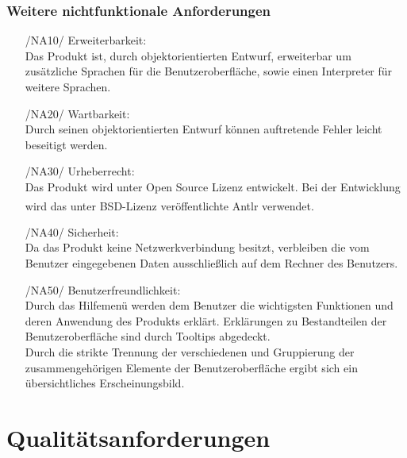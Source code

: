 \documentclass[parskip=full]{scrartcl}
\begin{document}
		\subsubsection{Weitere nichtfunktionale Anforderungen}
		\begin{itemize}
		\item[/NA10/]Erweiterbarkeit: \\
		Das Produkt ist, durch objektorientierten Entwurf, erweiterbar um zusätzliche Sprachen für die Benutzeroberfläche, sowie einen Interpreter für weitere Sprachen.
		\item[/NA20/]Wartbarkeit: \\
		Durch seinen objektorientierten Entwurf können auftretende Fehler leicht beseitigt werden.
		\item[/NA30/]Urheberrecht: \\
		Das Produkt wird unter Open Source Lizenz entwickelt. Bei der Entwicklung wird das unter BSD-Lizenz veröffentlichte Antlr\textsuperscript{\textcopyright} verwendet.
		\item[/NA40/] Sicherheit: \\
		Da das Produkt keine Netzwerkverbindung besitzt, verbleiben die vom Benutzer eingegebenen Daten ausschließlich auf dem Rechner des Benutzers.
		\item[/NA50/]Benutzerfreundlichkeit: \\
		Durch das Hilfemenü werden dem Benutzer die wichtigsten Funktionen und deren Anwendung des Produkts erklärt. Erklärungen zu Bestandteilen der Benutzeroberfläche sind durch \glspl{Tooltip} abgedeckt. \\
		Durch die strikte Trennung der verschiedenen und Gruppierung der zusammengehörigen Elemente der Benutzeroberfläche ergibt sich ein übersichtliches Erscheinungsbild. 
		\end{itemize}
		

\section{Qualitätsanforderungen}
\end{document}
